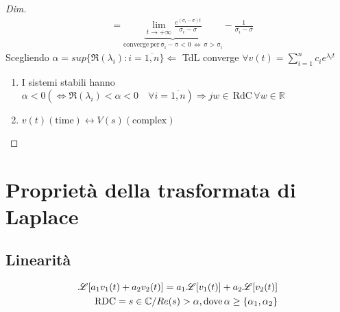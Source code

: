 \begin{definizione}
\begin{proof}[Dim]
\[\begin{split}
            & = \underbrace{\lim_{t\to+\infty}\frac{e^{(\sigma_i - \sigma)t}}{\sigma_i - \sigma}}_{\mathrm{converge\, per\, \sigma_i - \sigma < 0 \,\Leftrightarrow\, \sigma > \sigma_i}} - \frac{1}{\sigma_i - \sigma}
         \end{split}
      \]
      Scegliendo $\alpha = sup\{\Re(\lambda_i) : i = \overline{1,n}\} \Leftarrow$ TdL converge $\displaystyle\forall v(t) = \sum_{i = 1}^nc_ie^{\lambda_it}$ \AdC
      \begin{osservazione}
         \begin{enumerate}
            \item I sistemi stabili hanno $\displaystyle \alpha < 0(\Leftrightarrow \Re(\lambda_i) < \alpha < 0\quad \forall i = \overline{1,n}) \Rightarrow jw\in\mathrm{\,RdC\,}\forall w\in\mathbb{R}$
            \item $v(t) (\mathrm{time}) \leftrightarrow V(s)(\mathrm{complex})$
         \end{enumerate}
      \end{osservazione}
   \end{proof}
\end{definizione}

\section{Proprietà della trasformata di Laplace}
\subsection{Linearità}
\[
   \begin{split}
      \mathscr{L}[a_1v_1(t) + a_2v_2(t)] = a_1\mathscr{L}[v_1(t)] + a_2\mathscr{L}[v_2(t)]\\
      \mathrm{RDC} = {s\in\mathbb{C} / Re(s)>\alpha}\mathrm{, dove}\,\alpha\ge\{\alpha_1, \alpha_2\}
   \end{split}
\]
